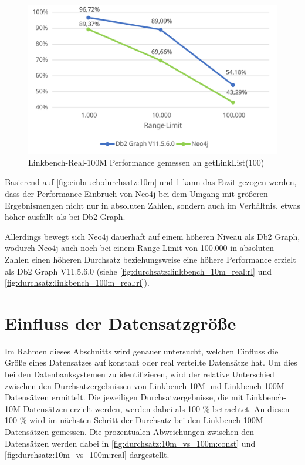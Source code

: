 \begin{figure}[!ht]
    \centering
    \includegraphics[width=\textwidth]{images/diagramme/limit_relative_durchsatz_real_100m.pdf}
    \caption{Linkbench-Real-100M Performance gemessen an getLinkList(100)}
    \label{fig:einbruch:durchsatz:100m}
\end{figure}

Basierend auf \autoref{fig:einbruch:durchsatz:10m} und \ref{fig:einbruch:durchsatz:100m} kann das Fazit gezogen werden, dass der Performance-Einbruch von Neo4j bei dem Umgang mit größeren Ergebnismengen nicht nur in absoluten Zahlen, sondern auch im Verhältnis, etwas höher ausfällt als bei Db2 Graph. 

Allerdings bewegt sich Neo4j dauerhaft auf einem höheren Niveau als Db2 Graph, wodurch Neo4j auch noch bei einem Range-Limit von 100.000 in absoluten Zahlen einen höheren Durchsatz beziehungsweise eine höhere Performance erzielt als Db2 Graph V11.5.6.0 (siehe \autoref{fig:durchsatz:linkbench_10m_real:rl} und \ref{fig:durchsatz:linkbench_100m_real:rl}).

\section{Einfluss der Datensatzgröße}
\label{auswertung:groesse}
Im Rahmen dieses Abschnitts wird genauer untersucht, welchen Einfluss die Größe eines Datensatzes auf konstant oder real verteilte Datensätze hat. Um dies bei den Datenbanksystemen zu identifizieren, wird der relative Unterschied zwischen den Durchsatzergebnissen von Linkbench-10M und Linkbench-100M Datensätzen ermittelt. Die jeweiligen Durchsatzergebnisse, die mit Linkbench-10M Datensätzen erzielt werden, werden dabei als 100 \% betrachtet. An diesen 100 \% wird im nächsten Schritt der Durchsatz bei den Linkbench-100M Datensätzen gemessen. Die prozentualen Abweichungen zwischen den Datensätzen werden dabei in \autoref{fig:durchsatz:10m_vs_100m:const} und \ref{fig:durchsatz:10m_vs_100m:real} dargestellt.

